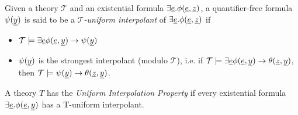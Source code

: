 \begin{definition}
  Given a theory $\mathcal{T}$ and an existential formula $\exists \underline{e} . \phi(\underline{e}, \underline{z})$, a quantifier-free formula 
  $\psi(\underline{y})$ is said to be a 
  $\mathcal{T}$\emph{-uniform interpolant} of 
  $\exists \underline{e} . \phi(\underline{e}, \underline{z})$ if

  \begin{itemize}
    \item $\mathcal{T} \models \exists 
      \underline{e} \phi(\underline{e}, \underline{y}) \rightarrow \psi(\underline{y})$
    \item $\psi(\underline{y})$ is the strongest interpolant
      (modulo $\mathcal{T}$), i.e. 
      if $\mathcal{T} \models \exists 
      \underline{e} \phi(\underline{e}, \underline{y}) \rightarrow \theta(\underline{z}, \underline{y})$, then $\mathcal{T} \models \psi(\underline{y}) \rightarrow \theta(\underline{z}, \underline{y})$.
  \end{itemize}

  A theory $T$ has the \emph{Uniform Interpolation Property} 
  if every existential formula
  $\exists \underline{e} . \phi(\underline{e},\underline{y})$ has a T-uniform interpolant. 

\end{definition}

